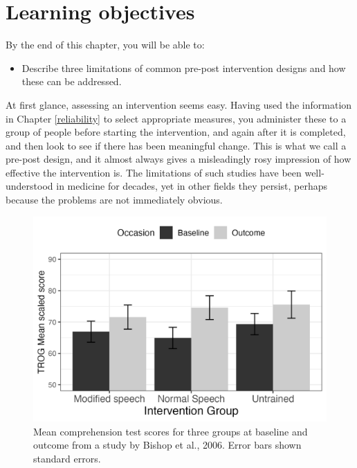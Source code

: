 \documentclass{krantz}
\providecommand{\tightlist}{%
\setlength{\itemsep}{0pt}\setlength{\parskip}{0pt}}
\begin{document}
\hypertarget{learning-objectives-4}{%
\section{Learning objectives}\label{learning-objectives-4}}

By the end of this chapter, you will be able to:

\begin{itemize}
\tightlist
\item
  Describe three limitations of common pre-post intervention designs and how these can be addressed.
\end{itemize}

At first glance, assessing an intervention seems easy. Having used the information in Chapter \ref{reliability} to select appropriate measures, you administer these to a group of people before starting the intervention, and again after it is completed, and then look to see if there has been meaningful change. This is what we call a pre-post design, and it almost always gives a misleadingly rosy impression of how effective the intervention is. The limitations of such studies have been well-understood in medicine for decades, yet in other fields they persist, perhaps because the problems are not immediately obvious.

\begin{figure}
\includegraphics[width=0.8\linewidth]{images_bw/trogchangefig} \caption{Mean comprehension test scores for three groups at baseline and outcome from a study by Bishop et al., 2006. Error bars shown standard errors.}\label{fig:trogfig}
\end{figure}
\end{document}
